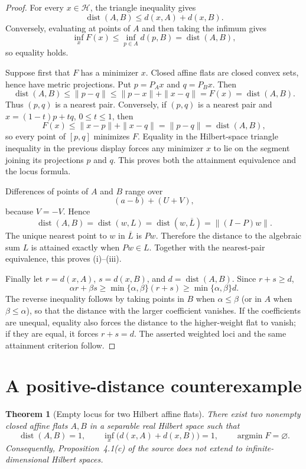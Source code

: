 \documentclass[11pt]{article}
\newtheorem{theorem}{Theorem}
\newcommand{\Hsp}{\mathcal H}
\newcommand{\Argmin}{\operatorname*{argmin}}
\newcommand{\dist}{\operatorname{dist}}
\begin{document}
\begin{proof}
For every $x\in\Hsp$, the triangle inequality gives
\[
 \dist(A,B)\le d(x,A)+d(x,B).
\]
Conversely, evaluating at points of $A$ and then taking the infimum gives
\[
 \inf_x F(x)\le \inf_{p\in A}d(p,B)=\dist(A,B),
\]
so equality holds.

Suppose first that $F$ has a minimizer $x$.  Closed affine flats are closed
convex sets, hence have metric projections.  Put $p=P_Ax$ and $q=P_Bx$.
Then
\[
 \dist(A,B)\le\|p-q\|
 \le\|p-x\|+\|x-q\|=F(x)=\dist(A,B).
\]
Thus $(p,q)$ is a nearest pair.  Conversely, if $(p,q)$ is a nearest pair
and $x=(1-t)p+tq$, $0\le t\le1$, then
\[
 F(x)\le\|x-p\|+\|x-q\|=\|p-q\|=\dist(A,B),
\]
so every point of $[p,q]$ minimizes $F$.  Equality in the Hilbert-space
triangle inequality in the previous display forces any minimizer $x$ to lie
on the segment joining its projections $p$ and $q$.  This proves both the
attainment equivalence and the locus formula.

Differences of points of $A$ and $B$ range over
\[
 (a-b)+(U+V),
\]
because $V=-V$.  Hence
\[
 \dist(A,B)=\dist(w,L)=\dist(w,\overline L)=\|(I-P)w\|.
\]
The unique nearest point to $w$ in $\overline L$ is $Pw$.  Therefore the
distance to the algebraic sum $L$ is attained exactly when $Pw\in L$.
Together with the nearest-pair equivalence, this proves (i)--(iii).

Finally let $r=d(x,A)$, $s=d(x,B)$, and $d=\dist(A,B)$.  Since $r+s\ge d$,
\[
 \alpha r+\beta s\ge\min\{\alpha,\beta\}(r+s)
 \ge\min\{\alpha,\beta\}d.
\]
The reverse inequality follows by taking points in $B$ when $\alpha\le\beta$
(or in $A$ when $\beta\le\alpha$), so that the distance with the larger
coefficient vanishes.  If the
coefficients are unequal, equality also forces the distance to the
higher-weight flat to vanish; if they are equal, it forces $r+s=d$.
The asserted weighted loci and the same attainment criterion follow.
\end{proof}

\section{A positive-distance counterexample}

\begin{theorem}[Empty locus for two Hilbert affine flats]\label{thm:example}
There exist two nonempty closed affine flats $A,B$ in a separable real Hilbert
space such that
\[
 \dist(A,B)=1,
 \qquad
 \inf_x\bigl(d(x,A)+d(x,B)\bigr)=1,
 \qquad
 \Argmin F=\varnothing.
\]
Consequently, Proposition~4.1(c) of the source does not extend to
infinite-dimensional Hilbert spaces.
\end{theorem}
\end{document}
